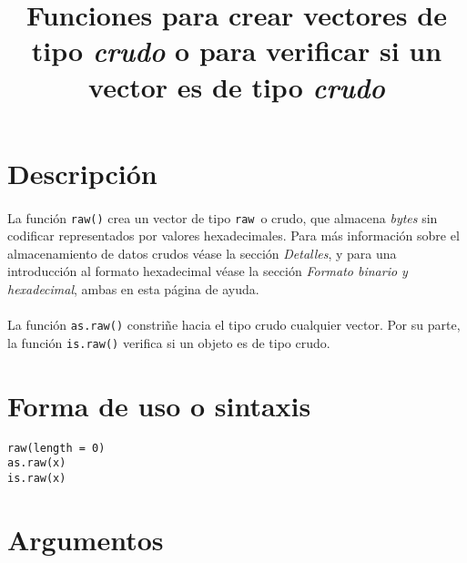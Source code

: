 \documentclass{article}[letter, 12pt]
\makeatletter
\newlength\tindent
\renewcommand{\indent}{\hspace*{\tindent}}
\def\code#1{\texttt{#1}}
\renewcommand{\maketitle}{\bgroup\setlength{\parindent}{0pt}
\begin{flushleft}
  \textbf{\@title}
  \@author
\end{flushleft}\egroup
}
\makeatother
\begin{document}
	\title{\Huge{Funciones para crear vectores de tipo \textit{crudo} o para verificar si un vector es de tipo \textit{crudo}}}
	\maketitle
	\section{\color{gray}Descripción}
\paragraph{}La función \code{raw()} crea un vector de tipo \textquotedbl\code{raw}\textquotedbl\ o crudo, que almacena \textit{bytes} sin codificar representados por valores hexadecimales. Para más información sobre el almacenamiento de datos crudos véase la sección \textit{Detalles}, y para una introducción al formato hexadecimal véase la sección \textit{Formato binario y hexadecimal}, ambas en esta página de ayuda.\par
\paragraph{}La función \code{as.raw()} constriñe hacia el tipo crudo cualquier vector. Por su parte, la función \code{is.raw()} verifica si un objeto es de tipo crudo.\par
\tableofcontents{}
\section{\color{gray}Forma de uso o sintaxis}
\indent\code{raw(length = 0)}\\
\indent\code{as.raw(x)}\\
\indent\code{is.raw(x)}\\

\section{\color{gray}Argumentos}
\end{document}
